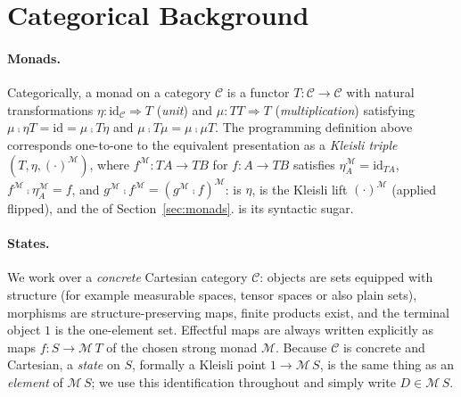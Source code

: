 \documentclass[anon]{../../journal-templates/NeSy26/nesy2026} %
\begin{document}



\newpage
\appendix
\section{Categorical Background}\label{app:cat}

\paragraph{Monads.} Categorically, a monad on a category $\mathcal C$ is a functor $T \colon \mathcal C \to
\mathcal C$ with natural transformations $\eta \colon \mathrm{id}_{\mathcal C} \Rightarrow
T$ (\emph{unit}) and $\mu \colon TT \Rightarrow T$ (\emph{multiplication}) satisfying
$\mu \comp \eta T = \mathrm{id} = \mu \comp T\eta$ and $\mu \comp T\mu = \mu \comp \mu T$. The programming definition above corresponds
one-to-one to the equivalent presentation as a \emph{Kleisli triple} $(T, \eta, (\cdot)^{\mathcal M})$,
where $f^{\mathcal M} \colon TA \to TB$ for $f \colon A \to TB$ satisfies $\eta_A^{\mathcal M} =
\mathrm{id}_{TA}$, $f^{\mathcal M} \comp \eta_A^{\mathcal M} = f$, and $g^{\mathcal M} \comp f^{\mathcal M} = (g^{\mathcal M} \comp f)^{\mathcal M}$:  is $\eta$, \minth{(>>=)} is the
Kleisli lift $(\cdot)^{\mathcal M}$ (applied flipped), and the \doNotation of Section~\ref{sec:monads}.
is its syntactic sugar.


  \paragraph{States.} We work over a \emph{concrete} Cartesian category $\mathcal{C}$: objects are sets equipped
  with structure (for example measurable spaces, tensor spaces or also plain sets), morphisms are
  structure-preserving maps, finite products exist, and the terminal object $1$ is the
  one-element set. Effectful maps are always written explicitly as maps
  $f \colon S \to \mathcal M\,T$ of the chosen strong monad $\mathcal M$.
  Because $\mathcal{C}$ is concrete and Cartesian, a \emph{state} on $S$, formally a Kleisli
  point $1 \to \mathcal M\,S$, is the same thing as an \emph{element} of $\mathcal M\,S$; we
  use this identification throughout and simply write $D \in \mathcal M\,S$. 
 
\end{document}
